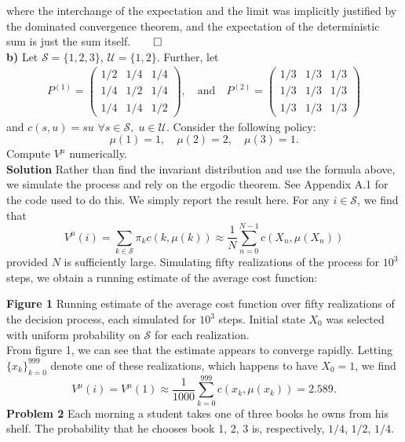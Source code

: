 \documentclass[11pt, letterpaper]{article}
\newcommand{\mc}[1]{\mathcal{#1}}
\begin{document}
    where the interchange of the expectation and the limit was implicitly justified by the dominated convergence theorem, and the expectation of the deterministic sum is just the sum itself.\hfill{$\qed$}\\[10pt]
    {\bf b)} Let $\mc{S}=\{1,2,3\}$, $\mc{U}=\{1,2\}$. Further, let
    \begin{align*}
        P^{(1)}=\begin{pmatrix}
            1/2 & 1/4 & 1/4\\
            1/4 & 1/2 & 1/4\\
            1/4 & 1/4 & 1/2
        \end{pmatrix},\quad\text{and}\quad P^{(2)}=\begin{pmatrix}
            1/3 & 1/3 & 1/3 \\
            1/3 & 1/3 & 1/3\\
            1/3 & 1/3 & 1/3
        \end{pmatrix}
    \end{align*}
    and $c(s,u)=su$ $\forall s\in\mc{S},\;u\in\mc{U}$. Consider the following policy:
    \[\mu(1)=1,\quad\mu(2)=2,\quad\mu(3)=1.\]
    Compute $V^\mu$ numerically.\\[10pt]
    {\bf Solution} Rather than find the invariant distribution and use the formula above, we simulate the process and rely on the ergodic theorem. See Appendix A.1 for the code used to do this.
    We simply report the result here. For any $i\in\mc{S}$, we find that
    \[V^\mu(i)=\sum_{k\in\mc{S}}\pi_kc(k,\mu(k))\approx\frac{1}{N}\sum_{n=0}^{N-1}c(X_n,\mu(X_n))\]
    provided $N$ is sufficiently large. Simulating fifty realizations of the process for $10^3$ steps, we obtain a running estimate of the average cost function:
    \begin{center}
    \end{center}
    {\bf Figure 1} Running estimate of the average cost function over fifty realizations of the decision process, each simulated for $10^3$ steps. Initial state $X_0$ was selected with uniform probability on $\mc{S}$ for each realization.\\[10pt]
    From figure 1, we can see that the estimate appears to converge rapidly. Letting $\{x_k\}_{k=0}^{999}$ denote one of these realizations, which happens to have $X_0=1$, we find
    \[V^\mu(i)=V^\mu(1)\approx \frac{1}{1000}\sum_{k=0}^{999}c(x_k, \mu(x_k))=2.589.\tag*{$\qed$}\]
    {\bf Problem 2} Each morning a student takes one of three books he owns from his shelf. The probability that he chooses book 1, 2, 3 is, respectively, $1/4$, $1/2$, $1/4$.
\end{document}
